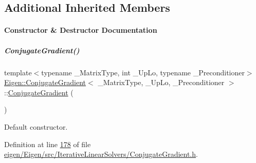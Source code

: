 \subsection*{Additional Inherited Members}


\paragraph{Constructor \& Destructor Documentation}
\mbox{\label{group___iterative_linear_solvers___module_a92a9656ca9fa4da240194f89229255eb}} 
\subparagraph{\texorpdfstring{Conjugate\+Gradient()}{ConjugateGradient()}\hspace{0.1cm}{\footnotesize\ttfamily [1/4]}}
{\footnotesize\ttfamily template$<$typename \+\_\+\+Matrix\+Type, int \+\_\+\+Up\+Lo, typename \+\_\+\+Preconditioner$>$ \\
\hyperlink{group___iterative_linear_solvers___module_class_eigen_1_1_conjugate_gradient}{Eigen\+::\+Conjugate\+Gradient}$<$ \+\_\+\+Matrix\+Type, \+\_\+\+Up\+Lo, \+\_\+\+Preconditioner $>$\+::\hyperlink{group___iterative_linear_solvers___module_class_eigen_1_1_conjugate_gradient}{Conjugate\+Gradient} (\begin{DoxyParamCaption}{ }\end{DoxyParamCaption})\hspace{0.3cm}{\ttfamily [inline]}}

Default constructor. 

Definition at line \hyperlink{eigen_2_eigen_2src_2_iterative_linear_solvers_2_conjugate_gradient_8h_source_l00178}{178} of file \hyperlink{eigen_2_eigen_2src_2_iterative_linear_solvers_2_conjugate_gradient_8h_source}{eigen/\+Eigen/src/\+Iterative\+Linear\+Solvers/\+Conjugate\+Gradient.\+h}.

